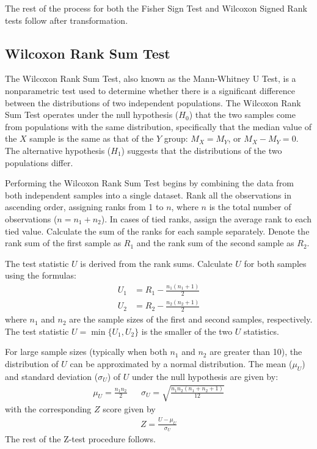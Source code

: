 \documentclass{article}
\begin{document}
The rest of the process for both the Fisher Sign Test and Wilcoxon Signed Rank tests follow after transformation.

\subsection{Wilcoxon Rank Sum Test}

The Wilcoxon Rank Sum Test, also known as the Mann-Whitney U Test, is a nonparametric test used to determine whether there is a significant difference between the distributions of two independent populations. The Wilcoxon Rank Sum Test operates under the null hypothesis ($H_0$) that the two samples come from populations with the same distribution, specifically that the median value of the $X$ sample is the same as that of the $Y$ group: $M_X = M_Y$, or $M_X - M_Y = 0$. The alternative hypothesis ($H_1$) suggests that the distributions of the two populations differ.

Performing the Wilcoxon Rank Sum Test begins by combining the data from both independent samples into a single dataset. Rank all the observations in ascending order, assigning ranks from 1 to $n$, where $n$ is the total number of observations ($n = n_1 + n_2$). In cases of tied ranks, assign the average rank to each tied value. Calculate the sum of the ranks for each sample separately. Denote the rank sum of the first sample as $R_1$ and the rank sum of the second sample as $R_2$.

The test statistic $U$ is derived from the rank sums. Calculate $U$ for both samples using the formulas:
\begin{align}
U_1 & = R_1 - \frac{n_1 (n_1 + 1)}{2} \\
U_2 & = R_2 - \frac{n_2 (n_2 + 1)}{2}
\end{align}
where $n_1$ and $n_2$ are the sample sizes of the first and second samples, respectively. The test statistic $U = \min\{U_1, U_2\}$ is the smaller of the two $U$ statistics.

For large sample sizes (typically when both $n_1$ and $n_2$ are greater than 10), the distribution of $U$ can be approximated by a normal distribution. The mean ($\mu_U$) and standard deviation ($\sigma_U$) of $U$ under the null hypothesis are given by:
\begin{align}
\mu_U = \frac{n_1 n_2}{2} && \sigma_U = \sqrt{\frac{n_1 n_2 (n_1 + n_2 + 1)}{12}}
\end{align}
with the corresponding $Z$ score given by
\begin{align}
Z = \frac{U - \mu_U}{\sigma_U}
\end{align}
The rest of the Z-test procedure follows.
\end{document}
